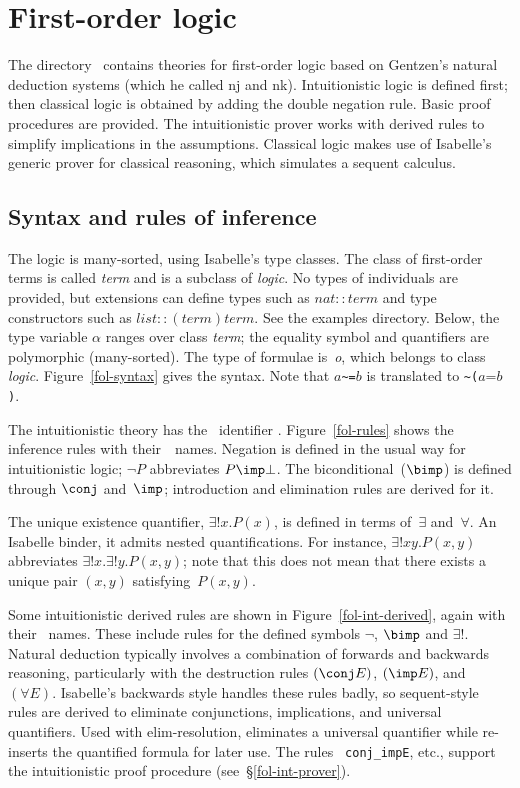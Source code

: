 \chapter{First-order logic}
The directory~ contains theories for first-order logic
based on Gentzen's natural deduction systems (which he called {\sc nj} and
{\sc nk}).  Intuitionistic logic is defined first; then classical logic is
obtained by adding the double negation rule.  Basic proof procedures are
provided.  The intuitionistic prover works with derived rules to simplify
implications in the assumptions.  Classical logic makes use of Isabelle's
generic prover for classical reasoning, which simulates a sequent calculus.

\section{Syntax and rules of inference}
The logic is many-sorted, using Isabelle's type classes.  The
class of first-order terms is called {\it term} and is a subclass of
{\it logic}.  No types of individuals
are provided, but extensions can define types such as $nat::term$ and type
constructors such as $list::(term)term$.  See the examples directory.
Below, the type variable $\alpha$ ranges over class {\it term\/}; the
equality symbol and quantifiers are polymorphic (many-sorted).  The type of
formulae is~{\it o}, which belongs to class {\it logic}.
Figure~\ref{fol-syntax} gives the syntax.  Note that $a$\verb|~=|$b$ is
translated to \verb|~(|$a$=$b$\verb|)|.

The intuitionistic theory has the \ML\ identifier
.  Figure~\ref{fol-rules} shows the inference
rules with their~\ML\ names.  Negation is defined in the usual way for
intuitionistic logic; $\neg P$ abbreviates $P\imp\bot$.  The
biconditional~($\bimp$) is defined through $\conj$ and~$\imp$; introduction
and elimination rules are derived for it.  

The unique existence quantifier, $\exists!x.P(x)$, is defined in terms
of~$\exists$ and~$\forall$.  An Isabelle binder, it admits nested
quantifications.  For instance, $\exists!x y.P(x,y)$ abbreviates
$\exists!x. \exists!y.P(x,y)$; note that this does not mean that there
exists a unique pair $(x,y)$ satisfying~$P(x,y)$.

Some intuitionistic derived rules are shown in
Figure~\ref{fol-int-derived}, again with their \ML\ names.  These include
rules for the defined symbols $\neg$, $\bimp$ and $\exists!$.  Natural
deduction typically involves a combination of forwards and backwards
reasoning, particularly with the destruction rules $(\conj E)$,
$({\imp}E)$, and~$(\forall E)$.  Isabelle's backwards style handles these
rules badly, so sequent-style rules are derived to eliminate conjunctions,
implications, and universal quantifiers.  Used with elim-resolution,
 eliminates a universal quantifier while 
re-inserts the quantified formula for later use.  The rules {\tt
conj_impE}, etc., support the intuitionistic proof procedure
(see~\S\ref{fol-int-prover}).

